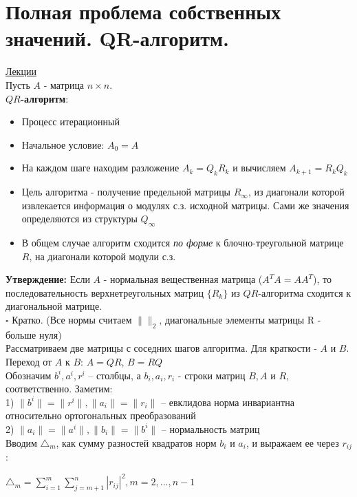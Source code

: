 \documentclass[specialist, subf, href, colorlinks=true, 12pt, times, mtpro, final]{disser}
\theoremstyle{definition}
\begin{document}
{    

\section {Полная проблема собственных значений. QR-алгоритм.}
    \hyperlink {lects.79}{Лекции}\\
\noindent Пусть $A$ - матрица $n\times n$.
\\
\textbf{$QR$-алгоритм}:
\begin{itemize}
\item Процесс итерационный
\item Начальное условие: $A_0 = A$
\item На каждом шаге находим разложение $A_k = Q_kR_k$ и  вычисляем $A_{k+1} = R_k Q_k $
\item Цель алгоритма - получение предельной матрицы $R_{\infty}$, из диагонали которой извлекается информация о  модулях с.з. исходной матрицы. Сами же значения определяются из структуры $Q_{\infty}$

\item В общем случае алгоритм сходится \textit{по форме} к блочно-треугольной матрице $R$, на диагонали которой модули с.з.
\end{itemize}
\textbf{Утверждение:}
Если $A$ - нормальная вещественная матрица ($A^TA = AA^T$), то последовательность верхнетреугольных матриц $\{R_k\}$ из $QR$-алгоритма сходится к диагональной матрице.
\\
$\square$ Кратко. (Все нормы считаем $\|\|_2$, диагональные элементы матрицы R - больше нуля)\\
Рассматриваем две матрицы с соседних шагов алгоритма. Для краткости - $A$ и $B$. \\
Переход от $A$ к $B$: $A = QR$, $B = RQ$\\
Обозначим $b^i, a^i, r^i$ \--- столбцы, а $b_i, a_i, r_i$ - строки матриц $B, A$ и $R$, соответственно. 
Заметим:\\
1) $\|b^i\| = \|r^i\|, \|a_i\| = \|r_i\|$ \--- евклидова норма инвариантна относительно ортогональных преобразований\\
2) $\|a_i\| = \|a^i\|, \|b_i\| = \|b^i\|$ \--- нормальность матриц\\
Вводим $\triangle_m$, как сумму разностей квадратов норм $b_i$ и $a_i$, и выражаем ее через $r_{ij}$:
\begin{center}
$\triangle_m = \sum\limits^m_{i=1} \sum\limits^n_{j=m+1} |r_{ij}|^2, m =2, ... , n-1$
\end{center}

}
\end{document}
